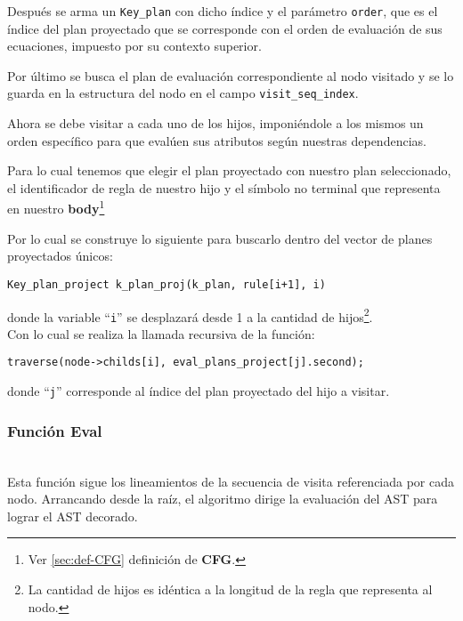 Después se arma un \texttt{Key\_plan} con dicho índice y el parámetro \texttt{order}, que es el índice del plan proyectado que se corresponde con el orden de evaluación de sus ecuaciones, impuesto por su contexto superior.

Por último se busca el plan de evaluación correspondiente al nodo visitado y se lo guarda en la estructura del nodo en el campo \texttt{visit\_seq\_index}.

Ahora se debe visitar a cada uno de los hijos, imponiéndole a los mismos un orden específico para que evalúen sus atributos según nuestras dependencias.

Para lo cual tenemos que elegir el plan proyectado con nuestro plan seleccionado, el identificador de regla de nuestro hijo y el símbolo no terminal que representa en nuestro \textbf{body}\footnote{Ver \ref{sec:def-CFG} definición de \textbf{CFG}.}

Por lo cual se construye lo siguiente para buscarlo dentro del vector de planes proyectados únicos:

\begin{center}\texttt{Key\_plan\_project k\_plan\_proj(k\_plan, rule[i+1], i)}\end{center}

donde la variable ``\texttt{i}'' se desplazará desde 1 a la cantidad de hijos\footnote{La cantidad de hijos es idéntica a la longitud de la regla que representa al nodo.}.\\

Con lo cual se realiza la llamada recursiva de la función:

\begin{center}\texttt{traverse(node->childs[i], eval\_plans\_project[j].second);}\end{center}

donde ``\texttt{j}'' corresponde al índice del plan proyectado del hijo a visitar.
\subsubsection{Función Eval}
\\

Esta función sigue los lineamientos de la secuencia de visita referenciada por cada nodo. Arrancando desde la raíz, el algoritmo dirige la evaluación del AST para lograr el AST decorado.

\vspace*{0.2cm}

